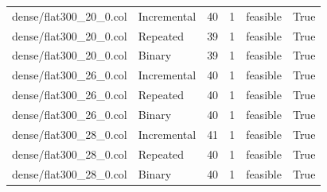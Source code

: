 \begin{table}[htbp]
\begin{tabular}{llllll}
dense/flat300\_20\_0.col & Incremental & 40 & 1 & feasible & True \\
dense/flat300\_20\_0.col & Repeated & 39 & 1 & feasible & True \\
dense/flat300\_20\_0.col & Binary & 39 & 1 & feasible & True \\
dense/flat300\_26\_0.col & Incremental & 40 & 1 & feasible & True \\
dense/flat300\_26\_0.col & Repeated & 40 & 1 & feasible & True \\
dense/flat300\_26\_0.col & Binary & 40 & 1 & feasible & True \\
dense/flat300\_28\_0.col & Incremental & 41 & 1 & feasible & True \\
dense/flat300\_28\_0.col & Repeated & 40 & 1 & feasible & True \\
dense/flat300\_28\_0.col & Binary & 40 & 1 & feasible & True \\
\hline
\end{tabular}
\end{table}
